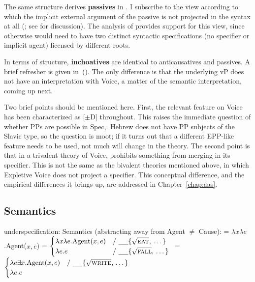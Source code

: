 The same structure derives \textbf{passives} in {\tnif}. I subscribe to the view according to which the implicit external argument of the passive is not projected in the syntax at all (\citealt{layering15}; see \citealt{bhattpancheva17} for discussion). The analysis of {\tnif} provides support for this view, since otherwise {\vz} would need to have two distinct syntactic specifications (no specifier or implicit agent) licensed by different roots.

In terms of structure, \textbf{inchoatives} are identical to anticausatives and passives. A brief refresher is given in~(\nextx). The only difference is that the underlying vP does not have an interpretation with Voice, a matter of the semantic interpretation, coming up next.

Two brief points should be mentioned here. First, the relevant feature on Voice has been characterized as [$\pm$D] throughout. This raises the immediate question of whether PPs are possible in Spec,{\vz}. Hebrew does not have PP subjects of the Slavic type, so the question is moot; if it turns out that a different EPP-like feature needs to be used, not much will change in the theory. The second point is that in a trivalent theory of Voice, {\vz} prohibits something from merging in its specifier. This is not the same as the bivalent theories mentioned above, in which Expletive Voice does not project a specifier. This conceptual difference, and the empirical differences it brings up, are addressed in Chapter~\ref{chap:aas}.

	\subsection{Semantics} \label{vz:vz:sem}

underspecification:
\pex\label{sem-feat}Semantics (abstracting away from Agent $\neq$ Cause):
	\a \denote{\vd} = $\lambda x \lambda e$.Agent($x,e$)
	\a {}\phantom{.......} = $\begin{cases}
		\lambda x \lambda e.\text{Agent}(x,e) & \text{/ \trace \{\root{\gsc{eat}}, \dots\} }\\
		\lambda e.e & \text{/ \trace \{\root{\gsc{fall}}, \dots\} }\\
	\end{cases}$
	\a \denote{\vz}\phantom{.} = $\begin{cases}
		\lambda e \exists x.\text{Agent}(x,e) & \text{/ \trace \{\root{\gsc{write}}, \dots\} }\\
		\lambda e.e & \\
	\end{cases}$
\xe

